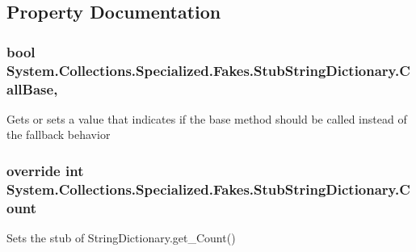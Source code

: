 \subsection{Property Documentation}
\hypertarget{class_system_1_1_collections_1_1_specialized_1_1_fakes_1_1_stub_string_dictionary_a74232cb9f8c6870ce1af5920504f0a76}{
\subsubsection[{Call\-Base}]{\setlength{\rightskip}{0pt plus 5cm}bool System.\-Collections.\-Specialized.\-Fakes.\-Stub\-String\-Dictionary.\-Call\-Base\hspace{0.3cm}{\ttfamily [get]}, {\ttfamily [set]}}}\label{class_system_1_1_collections_1_1_specialized_1_1_fakes_1_1_stub_string_dictionary_a74232cb9f8c6870ce1af5920504f0a76}


Gets or sets a value that indicates if the base method should be called instead of the fallback behavior

\hypertarget{class_system_1_1_collections_1_1_specialized_1_1_fakes_1_1_stub_string_dictionary_a5b7625b513097813319b6dd2a0118d2f}{
\subsubsection[{Count}]{\setlength{\rightskip}{0pt plus 5cm}override int System.\-Collections.\-Specialized.\-Fakes.\-Stub\-String\-Dictionary.\-Count\hspace{0.3cm}{\ttfamily [get]}}}\label{class_system_1_1_collections_1_1_specialized_1_1_fakes_1_1_stub_string_dictionary_a5b7625b513097813319b6dd2a0118d2f}


Sets the stub of String\-Dictionary.\-get\-\_\-\-Count()


